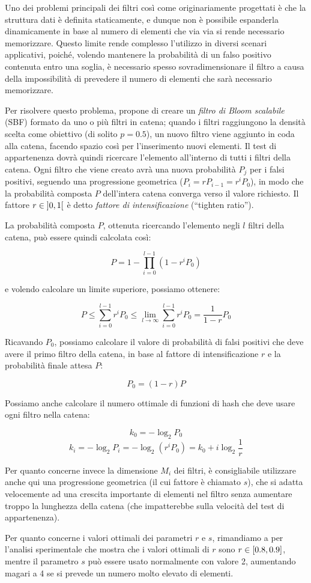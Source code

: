 Uno dei problemi principali dei filtri così come originariamente progettati è che la struttura
dati è definita staticamente, e dunque non è possibile espanderla dinamicamente in base al
numero di elementi che via via si rende necessario memorizzare. Questo limite rende complesso
l'utilizzo in diversi scenari applicativi, poiché, volendo mantenere la probabilità di un falso
positivo contenuta entro una soglia, è necessario spesso sovradimensionare il filtro a causa della 
impossibilità di prevedere il numero di elementi che sarà necessario memorizzare.

Per risolvere questo problema, \cite{bloomscalable} propone di creare un \emph{filtro di Bloom
scalabile} (SBF) formato da uno o più filtri in catena; quando i filtri raggiungono la densità
scelta come obiettivo (di solito $p=0.5$), un nuovo filtro viene aggiunto in coda alla catena,
facendo spazio così per l'inserimento nuovi elementi. Il test di appartenenza dovrà quindi ricercare
l'elemento all'interno di tutti i filtri della catena. Ogni filtro che viene creato avrà una nuova
probabilità $P_j$ per i falsi positivi, seguendo una progressione geometrica ($P_i = rP_{i-1} =
r^iP_0$), in modo che la probabilità composta $P$ dell'intera catena converga verso il valore
richiesto. Il fattore $r \in \interval[open]{0}{1}$ è detto \emph{fattore di intensificazione}
(``tighten ratio'').

La probabilità composta $P$, ottenuta ricercando l'elemento negli $l$ filtri della catena, può
essere quindi calcolata così:

$$ P = 1 - \prod_{i=0}^{l-1}(1-r^iP_0) $$

e volendo calcolare un limite superiore, possiamo ottenere:

$$ P \leq \sum_{i=0}^{l-1} r^iP_0 \leq \lim_{l \rightarrow \infty} \sum_{i=0}^{l-1} r^iP_0 =
\frac{1}{1-r}P_0 $$

Ricavando $P_0$, possiamo calcolare il valore di probabilità di falsi positivi che deve avere
il primo filtro della catena, in base al fattore di intensificazione $r$ e la probabilità finale
attesa $P$:

$$ P_0 = (1-r)P $$

Possiamo anche calcolare il numero ottimale di funzioni di hash che deve usare ogni filtro nella
catena:

$$ k_0 = -\log_2{P_0} $$
$$ k_i = -\log_2{P_i} = -\log_2{(r^iP_0)} = k_0 + i \log_2{\frac{1}{r}} $$

Per quanto concerne invece la dimensione $M_i$ dei filtri, è consigliabile utilizzare anche qui
una progressione geometrica (il cui fattore è chiamato $s$), che si adatta velocemente ad una
crescita importante di elementi nel filtro senza aumentare troppo la lunghezza della catena (che
impatterebbe sulla velocità del test di appartenenza). 

Per quanto concerne i valori ottimali dei parametri $r$ e $s$, rimandiamo a \cite{bloomscalable} per
l'analisi sperimentale che mostra che i valori ottimali di $r$ sono $r \in \interval{0.8}{0.9}$,
mentre il parametro $s$ può essere usato normalmente con valore \num{2}, aumentando magari a \num{4}
se si prevede un numero molto elevato di elementi.

